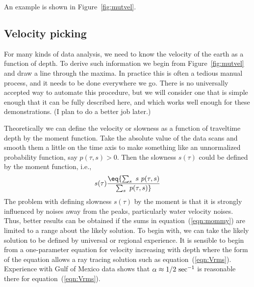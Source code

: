 
\par
An example %
is shown in Figure~\ref{fig:mutvel}.


\subsection{Velocity picking}
For many kinds of data analysis,
we need to know the velocity of the earth as a function of depth.
To derive such information
we begin from Figure~\ref{fig:mutvel}
and draw a line through the maxima.
In practice this is often a tedious manual process,
and it needs to be done everywhere we go.
There is no universally accepted way to automate
this procedure, but we will consider one
that is simple enough that it can be fully described here,
and which works well enough for these demonstrations.
(I plan to do a better job later.)

\par
Theoretically we can define the velocity or slowness
as a function of traveltime depth by the moment function.
Take the absolute value of the data scans and smooth
them a little on the time axis to make something like an unnormalized
probability function, say $p(\tau ,s)>0$.
Then the slowness $s(\tau )$ could be defined by the moment function, i.e.,
\begin{equation}
s(\tau ) \eq { \sum_s \ s\  p(\tau ,s) \over \sum_s \ p(\tau ,s) }
\label{eqn:mommy}
\end{equation}
The problem with defining slowness $s(\tau )$ by the moment is that it is 
strongly influenced by noises away from the peaks,
particularly water velocity noises.
Thus, better results can be obtained if the sums in equation~(\ref{eqn:mommy})
are limited to a range about the likely solution.
To begin with, we can take the likely solution to be defined
by universal or regional experience.
It is sensible to begin from a one-parameter equation
for velocity increasing with depth where the form of the equation
allows a ray tracing solution
such as equation~(\ref{eqn:Vrms}).
Experience with Gulf of Mexico data shows that
$\alpha\approx 1/2\  {\rm sec}^{-1}$ is reasonable there
for equation~(\ref{eqn:Vrms}).

